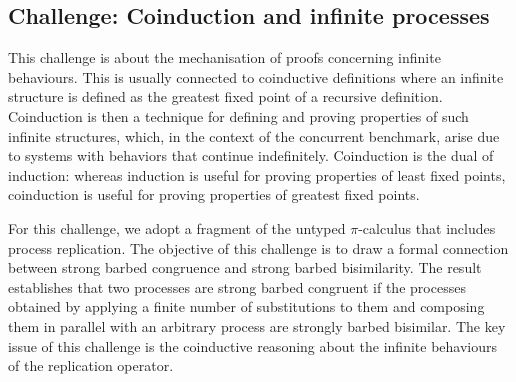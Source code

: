 \subsection{Challenge: Coinduction and infinite processes}
\label{sec:challenge:coinduction}


This challenge is  about the mechanisation of proofs concerning infinite behaviours.
%
This is usually connected to coinductive definitions where an infinite
structure is defined as the greatest fixed point of a recursive
definition.
%
Coinduction is then a technique for defining and proving properties of
such infinite structures,
%
which, in the context of the concurrent benchmark, arise
due to systems with behaviors that continue indefinitely.
%
Coinduction is the dual of induction: whereas induction is useful for
proving properties of least fixed points, coinduction is useful for
proving properties of greatest fixed points.
%
%

For this challenge, we adopt a fragment of the untyped $\pi$-calculus
that includes process replication.
The objective of this challenge is to %
draw a formal connection between strong barbed congruence and strong
barbed bisimilarity.  %
The result establishes that two processes are strong barbed congruent
if the processes obtained by applying a finite number of substitutions to
them and composing them in parallel with an arbitrary process are
strongly barbed bisimilar.
The key issue of this challenge is the coinductive reasoning about the infinite behaviours of the replication operator.


